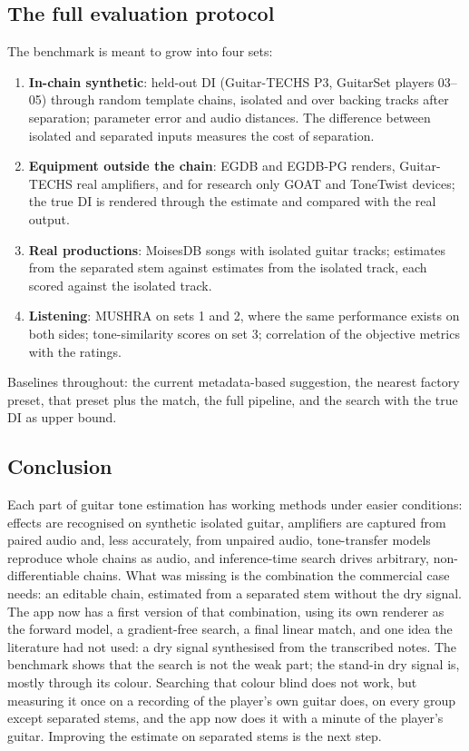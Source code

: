 \subsection{The full evaluation protocol}

The benchmark is meant to grow into four sets:
\begin{enumerate}
\item \textbf{In-chain synthetic}: held-out DI (Guitar-TECHS P3, GuitarSet
  players 03--05) through random template chains, isolated and over backing tracks
  after separation; parameter error and audio distances. The difference between
  isolated and separated inputs measures the cost of separation.
\item \textbf{Equipment outside the chain}: EGDB and EGDB-PG renders, Guitar-TECHS
  real amplifiers, and for research only GOAT and ToneTwist devices; the true DI
  is rendered through the estimate and compared with the real output.
\item \textbf{Real productions}: MoisesDB songs with isolated guitar tracks;
  estimates from the separated stem against estimates from the isolated track,
  each scored against the isolated track.
\item \textbf{Listening}: MUSHRA on sets 1 and 2, where the same performance
  exists on both sides; tone-similarity scores on set 3; correlation of the
  objective metrics with the ratings.
\end{enumerate}
Baselines throughout: the current metadata-based suggestion, the nearest factory
preset, that preset plus the match, the full pipeline, and the search with the
true DI as upper bound.

\subsection{Conclusion}

Each part of guitar tone estimation has working methods under easier conditions:
effects are recognised on synthetic isolated guitar, amplifiers are captured from
paired audio and, less accurately, from unpaired audio, tone-transfer models
reproduce whole chains as audio, and inference-time search drives arbitrary,
non-differentiable chains. What was missing is the combination the commercial
case needs: an editable chain, estimated from a separated stem without the dry
signal. The app now has a first version of that combination, using its own
renderer as the forward model, a gradient-free search, a final linear match,
and one idea the literature had not used: a dry signal synthesised from the
transcribed notes. The benchmark shows that the search is not the weak part; the
stand-in dry signal is, mostly through its colour. Searching that colour blind
does not work, but measuring it once on a recording of the player's own guitar
does, on every group except separated stems, and the app now does it with a
minute of the player's guitar. Improving the estimate on separated stems is the
next step.
